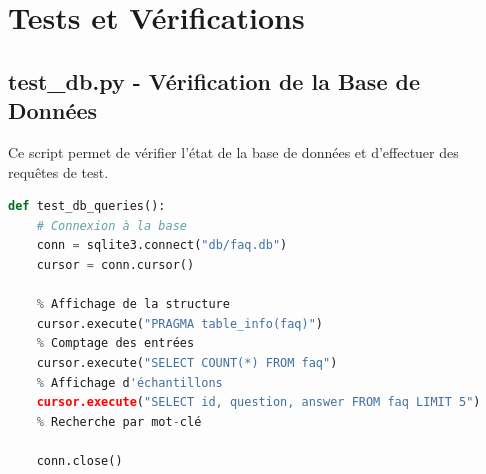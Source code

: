\documentclass[11pt,a4paper]{article}
\begin{document}
\section{Tests et Vérifications}
\label{sec:tests}

\subsection{test\_db.py - Vérification de la Base de Données}
\label{subsec:test-script}

Ce script permet de vérifier l'état de la base de données et d'effectuer des requêtes de test.

\begin{lstlisting}[language=Python, caption=test\_db.py - Fonctions principales]
def test_db_queries():
    # Connexion à la base
    conn = sqlite3.connect("db/faq.db")
    cursor = conn.cursor()
    
    % Affichage de la structure
    cursor.execute("PRAGMA table_info(faq)")
    % Comptage des entrées
    cursor.execute("SELECT COUNT(*) FROM faq")
    % Affichage d'échantillons
    cursor.execute("SELECT id, question, answer FROM faq LIMIT 5")
    % Recherche par mot-clé
    
    conn.close()
\end{lstlisting}

\end{document}
